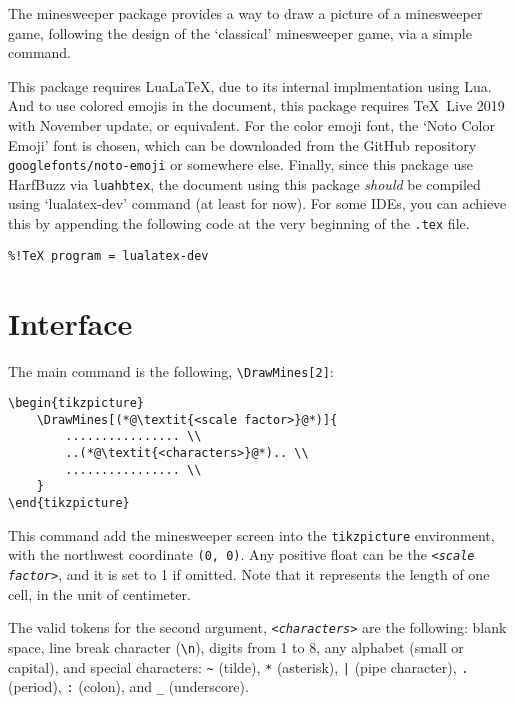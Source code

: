 \documentclass[a4paper,11pt]{article}
\begin{document}
The \textsf{minesweeper} package provides a way to draw a picture of a minesweeper game, following the design of the `classical' minesweeper game, via a simple command.

This package requires Lua\LaTeX, due to its internal implmentation using Lua. And to use colored emojis in the document, this package requires \TeX\ Live 2019 with November update, or equivalent. For the color emoji font, the `Noto Color Emoji' font is chosen, which can be downloaded from the GitHub repository \texttt{googlefonts/noto-emoji} or somewhere else. Finally, since this package use HarfBuzz via \texttt{luahbtex}, the document using this package \emph{should} be compiled using `lualatex-dev' command (at least for now). For some IDEs, you can achieve this by appending the following code at the very beginning of the \texttt{.tex} file.

\medskip

\verb|%!TeX program = lualatex-dev|



\section{Interface}

The main command is the following, \verb|\DrawMines[2]|:

\begin{lstlisting}
\begin{tikzpicture}
    \DrawMines[(*@\textit{<scale factor>}@*)]{
        ................ \\
        ..(*@\textit{<characters>}@*).. \\
        ................ \\
    }
\end{tikzpicture}
\end{lstlisting}

This command add the minesweeper screen into the \texttt{tikzpicture} environment, with the northwest coordinate \texttt{(0, 0)}. Any positive float can be the \texttt{\textit{<scale factor>}}, and it is set to 1 if omitted. Note that it represents the length of one cell, in the unit of centimeter.

The valid tokens for the second argument, \texttt{\textit{<characters>}} are the following: blank space, line break character (\verb|\n|), digits from 1 to 8, any alphabet (small or capital), and special characters: \verb|~| (tilde), \texttt{*} (asterisk), \texttt{|} (pipe character), \texttt{.} (period), \texttt{:} (colon), and \verb|_| (underscore).
\end{document}
